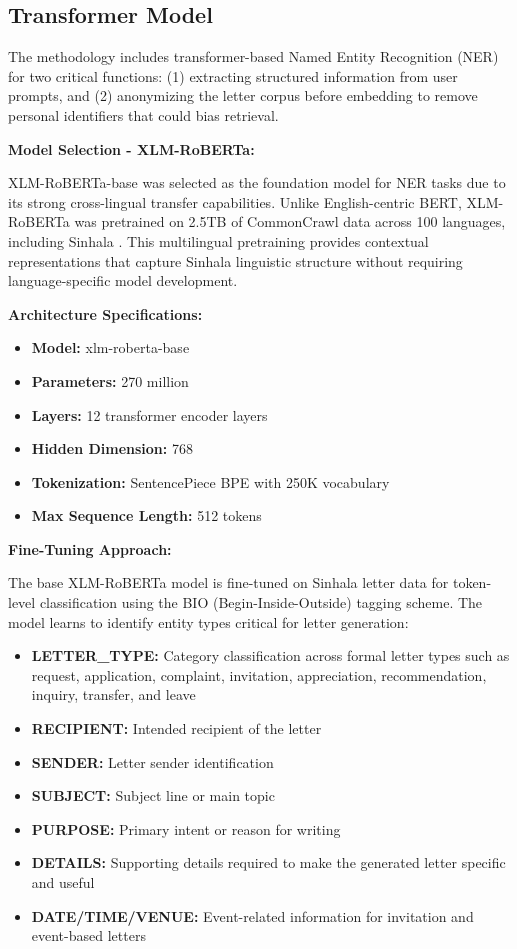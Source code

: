 \documentclass[12pt]{uomthesis}
\begin{document}
\subsection{Transformer Model}

The methodology includes transformer-based Named Entity Recognition (NER) for two critical functions: (1) extracting structured information from user prompts, and (2) anonymizing the letter corpus before embedding to remove personal identifiers that could bias retrieval.

\textbf{Model Selection - XLM-RoBERTa:}

XLM-RoBERTa-base was selected as the foundation model for NER tasks due to its strong cross-lingual transfer capabilities. Unlike English-centric BERT, XLM-RoBERTa was pretrained on 2.5TB of CommonCrawl data across 100 languages, including Sinhala \cite{conneau2019unsupervised}. This multilingual pretraining provides contextual representations that capture Sinhala linguistic structure without requiring language-specific model development.

\textbf{Architecture Specifications:}
\begin{itemize}
    \item \textbf{Model:} xlm-roberta-base
    \item \textbf{Parameters:} 270 million
    \item \textbf{Layers:} 12 transformer encoder layers
    \item \textbf{Hidden Dimension:} 768
    \item \textbf{Tokenization:} SentencePiece BPE with 250K vocabulary
    \item \textbf{Max Sequence Length:} 512 tokens
\end{itemize}

\textbf{Fine-Tuning Approach:}

The base XLM-RoBERTa model is fine-tuned on Sinhala letter data for token-level classification using the BIO (Begin-Inside-Outside) tagging scheme. The model learns to identify entity types critical for letter generation:

\begin{itemize}
    \item \textbf{LETTER\_TYPE:} Category classification across formal letter types such as request, application, complaint, invitation, appreciation, recommendation, inquiry, transfer, and leave
    \item \textbf{RECIPIENT:} Intended recipient of the letter
    \item \textbf{SENDER:} Letter sender identification
    \item \textbf{SUBJECT:} Subject line or main topic
    \item \textbf{PURPOSE:} Primary intent or reason for writing
    \item \textbf{DETAILS:} Supporting details required to make the generated letter specific and useful
    \item \textbf{DATE/TIME/VENUE:} Event-related information for invitation and event-based letters
\end{itemize}
\end{document}
